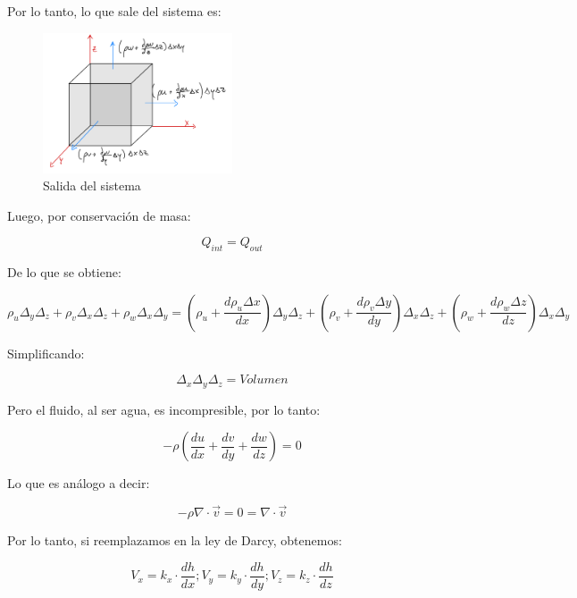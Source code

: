 Por lo tanto, lo que sale del sistema es:

\begin{figure}[H]
    \centering
    \includegraphics[width=0.5\textwidth]{FOTOS/out.jpg}
    \caption{Salida del sistema}
    \label{fig:ley_darcy_out}
\end{figure}

Luego, por conservación de masa:

\begin{equation}
    Q_{int} = Q_{out}
\end{equation}

De lo que se obtiene:

\begin{equation}
    \rho_u \Delta_y \Delta_z + \rho_v \Delta_x \Delta_z + \rho_w \Delta_x \Delta_y = (\rho_u + \frac{d\rho_u \Delta x}{dx})\Delta_y \Delta_z + (\rho_v + \frac{d\rho_v \Delta y}{dy})\Delta_x \Delta_z + (\rho_w + \frac{d\rho_w \Delta z}{dz})\Delta_x \Delta_y
\end{equation}

Simplificando:

\begin{equation}
    \Delta_x \Delta_y \Delta_z = Volumen
\end{equation}

Pero el fluido, al ser agua, es incompresible, por lo tanto:

\begin{equation}
   -\rho(\frac{du}{dx}+ \frac{dv}{dy}+ \frac{dw}{dz}) = 0
\end{equation}

Lo que es análogo a decir:

\begin{equation}
    -\rho \nabla \cdot \vec{v} = 0 = \nabla \cdot \vec{v}
\end{equation}

Por lo tanto, si reemplazamos en la ley de Darcy, obtenemos:

\begin{equation}
    V_x = k_x\cdot \frac{dh}{dx}; V_y = k_y\cdot \frac{dh}{dy}; V_z = k_z\cdot \frac{dh}{dz}
\end{equation}

